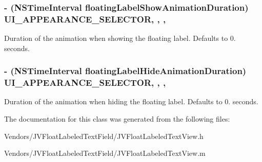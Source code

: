 \subsubsection[{U\+I\+\_\+\+A\+P\+P\+E\+A\+R\+A\+N\+C\+E\+\_\+\+S\+E\+L\+E\+C\+T\+O\+R}]{\setlength{\rightskip}{0pt plus 5cm}-\/ (N\+S\+Time\+Interval floating\+Label\+Show\+Animation\+Duration) U\+I\+\_\+\+A\+P\+P\+E\+A\+R\+A\+N\+C\+E\+\_\+\+S\+E\+L\+E\+C\+T\+O\+R\hspace{0.3cm}{\ttfamily [read]}, {\ttfamily [write]}, {\ttfamily [nonatomic]}, {\ttfamily [assign]}}\label{interface_j_v_float_labeled_text_view_ac4b09dae01394be968952a684e92adb4}
Duration of the animation when showing the floating label. Defaults to 0. seconds. \hypertarget{interface_j_v_float_labeled_text_view_ac0ed6f92806ad02cad8caa5d643620f4}{}
\subsubsection[{U\+I\+\_\+\+A\+P\+P\+E\+A\+R\+A\+N\+C\+E\+\_\+\+S\+E\+L\+E\+C\+T\+O\+R}]{\setlength{\rightskip}{0pt plus 5cm}-\/ (N\+S\+Time\+Interval floating\+Label\+Hide\+Animation\+Duration) U\+I\+\_\+\+A\+P\+P\+E\+A\+R\+A\+N\+C\+E\+\_\+\+S\+E\+L\+E\+C\+T\+O\+R\hspace{0.3cm}{\ttfamily [read]}, {\ttfamily [write]}, {\ttfamily [nonatomic]}, {\ttfamily [assign]}}\label{interface_j_v_float_labeled_text_view_ac0ed6f92806ad02cad8caa5d643620f4}
Duration of the animation when hiding the floating label. Defaults to 0. seconds. 

The documentation for this class was generated from the following files\+:\begin{DoxyCompactItemize}
\item 
Vendors/\+J\+V\+Float\+Labeled\+Text\+Field/J\+V\+Float\+Labeled\+Text\+View.\+h\item 
Vendors/\+J\+V\+Float\+Labeled\+Text\+Field/J\+V\+Float\+Labeled\+Text\+View.\+m\end{DoxyCompactItemize}
